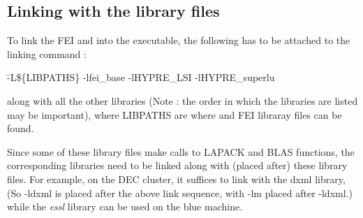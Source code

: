 \subsection{Linking with the library files}
                                                                                
To link the FEI and \hypre{} into the executable, the following has to be
attached to the linking command :
                                                                                
\begin{tabbing}
\hspace{0.5in} \= {\sf -L\$\{LIBPATHS\} -lfei\_base -lHYPRE\_LSI -lHYPRE_superlu}
\end{tabbing}
along with all the other libraries (Note : the order in which the libraries are
listed may be important), where {\sf LIBPATHS} are where
\hypre{} and FEI libraray files can be found.
                                                                                
Since some of these library files make calls to LAPACK and BLAS functions,
the corresponding libraries need to be linked along with (placed after) these
library files.  For example, on the DEC cluster, it suffices to link
with the {\sf dxml} library, (So {\sf -ldxml} is placed after the above link
sequence, with {\sf -lm} placed after {\sf -ldxml}.) while the {\it essl}
library can be used on the blue machine.

